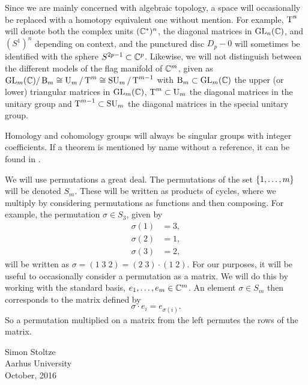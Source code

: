 Since we are mainly concerned with algebraic topology, a space will
occasionally be replaced with a homotopy equivalent one without
mention. For example, $\operatorname{T}^n$ will denote both the complex units
$(\mathbb{C}^*)^n$, the
diagonal matrices in $\operatorname{GL}_n(\mathbb{C})$, and $(S^1)^n$ depending
on context, and
the
punctured disc $D_p-0$ will sometimes be identified with the sphere
$S^{2p-1} \subset \mathbb{C}^p$. Likewise, we will not distinguish between the
different models of the flag manifold of $\mathbb{C}^m$, given as $\operatorname{GL}_{m}(\mathbb{C})/\operatorname{B}_{m}
\cong \operatorname{U}_{m}/\operatorname{T}^{m} \cong \operatorname{SU}_{m}/\operatorname{T}^{m-1}$ with $\operatorname{B}_m \subset \operatorname{GL}_m(\mathbb{C})$ the upper (or
lower) triangular matrices in $\operatorname{GL}_m(\mathbb{C})$, $\operatorname{T}^m \subset \operatorname{U}_m$ the
diagonal
matrices in the unitary group and $\operatorname{T}^{m-1}\subset \operatorname{SU}_m$ the diagonal
matrices in the special unitary group.

Homology and cohomology groups will always be singular groups
with integer coefficients. If a theorem is mentioned by name without a
reference, it can be found in \cite{hatcher}.

We will use permutations a great deal. The permutations of the set
$\left\{ 1,\dots,m \right\}$ will be denoted $S_m$.
These will be written as products of cycles, where we multiply by
considering permutations as functions and then composing. For
example, the
permutation $\sigma\in S_3$, given by
\begin{align*}
  \sigma(1) &= 3, \\
  \sigma(2) &= 1, \\
  \sigma(3) &= 2,
\end{align*}
will be written as $\sigma = (1 \; 3 \; 2) = (2\; 3)\cdot (1\; 2)$.
For our purposes, it will be useful to occasionally consider
a permutation as a matrix. We will do this by working with the
standard
basis, $e_1,\dots,e_m\in \mathbb{C}^m$. An element $\sigma \in S_m$ then
corresponds to the matrix defined by
\[ \sigma \cdot e_i = e_{\sigma(i)}. \]
So a permutation multiplied on a matrix from the left permutes the
rows of the matrix.


\vspace{5em}
\begin{flushright}
  Simon Stoltze \\
  Aarhus University\\
  October, 2016
\end{flushright}




